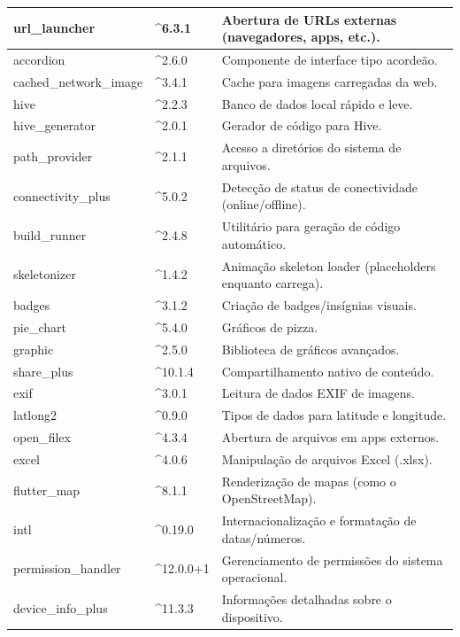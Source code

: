 \begin{table}[H]
\begin{tabular}{|p{4cm}|p{2.5cm}|p{8cm}|}
    url\_launcher & \^{}6.3.1 & Abertura de URLs externas (navegadores, apps, etc.). \\ \hline
    accordion & \^{}2.6.0 & Componente de interface tipo acordeão. \\ \hline
    cached\_network\_image & \^{}3.4.1 & Cache para imagens carregadas da web. \\ \hline
    hive & \^{}2.2.3 & Banco de dados local rápido e leve. \\ \hline
    hive\_generator & \^{}2.0.1 & Gerador de código para Hive. \\ \hline
    path\_provider & \^{}2.1.1 & Acesso a diretórios do sistema de arquivos. \\ \hline
    connectivity\_plus & \^{}5.0.2 & Detecção de status de conectividade (online/offline). \\ \hline
    build\_runner & \^{}2.4.8 & Utilitário para geração de código automático. \\ \hline
    skeletonizer & \^{}1.4.2 & Animação skeleton loader (placeholders enquanto carrega). \\ \hline
    badges & \^{}3.1.2 & Criação de badges/insígnias visuais. \\ \hline
    pie\_chart & \^{}5.4.0 & Gráficos de pizza. \\ \hline
    graphic & \^{}2.5.0 & Biblioteca de gráficos avançados. \\ \hline
    share\_plus & \^{}10.1.4 & Compartilhamento nativo de conteúdo. \\ \hline
    exif & \^{}3.0.1 & Leitura de dados EXIF de imagens. \\ \hline
    latlong2 & \^{}0.9.0 & Tipos de dados para latitude e longitude. \\ \hline
    open\_filex & \^{}4.3.4 & Abertura de arquivos em apps externos. \\ \hline
    excel & \^{}4.0.6 & Manipulação de arquivos Excel (.xlsx). \\ \hline
    flutter\_map & \^{}8.1.1 & Renderização de mapas (como o OpenStreetMap). \\ \hline
    intl & \^{}0.19.0 & Internacionalização e formatação de datas/números. \\ \hline
    permission\_handler & \^{}12.0.0+1 & Gerenciamento de permissões do sistema operacional. \\ \hline
    device\_info\_plus & \^{}11.3.3 & Informações detalhadas sobre o dispositivo. \\ \hline
    \end{tabular}
    \label{tab:dependencias_flutter}
\end{table}
    

